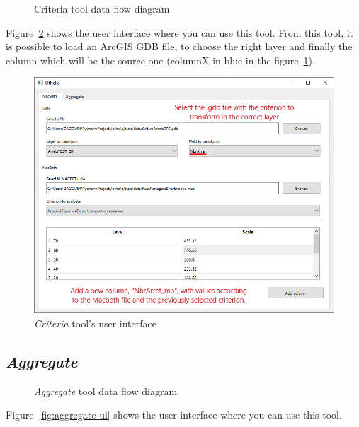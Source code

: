 \documentclass[11pt]{article}
\begin{document}
\begin{figure}[H]
    \centering
    
    \caption{Criteria tool data flow diagram}
    \label{fig:criteria-tool}
\end{figure}

Figure~\ref{fig:criteria-ui} shows the user interface where you can use this tool.
From this tool, it is possible to load an ArcGIS GDB file,
to choose the right layer and finally the column which will be the source one
(columnX in blue in the figure~\ref{fig:criteria-tool}).

\begin{figure}[H]
    \includegraphics[width=\linewidth]{../images/criteria_tool.png}
    \caption{\textit{Criteria} tool's user interface}
    \label{fig:criteria-ui}
\end{figure}

\subsection{\textit{Aggregate}}\label{subsec:aggregate}


\begin{figure}[H]
    \centering
    
    \caption{\textit{Aggregate} tool data flow diagram}
    \label{fig:aggregate-tool}
\end{figure}


Figure~\ref{fig:aggregate-ui} shows the user interface where you can use this tool.
\end{document}
